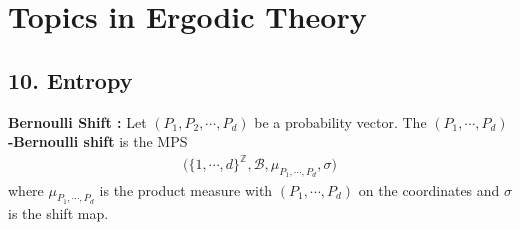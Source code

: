 \documentclass[12pt,a4paper]{report}
\DeclarePairedDelimiter\bignorm{\lVert}{\rVert}
\begin{document}
\newcommand{\thm}{\textbf{Theorem) }}
\newcommand{\thmnum}[1]{\textbf{Theorem #1) }}
\newcommand{\defi}{\textbf{Definition) }}
\newcommand{\lem}{\textbf{Lemma) }}
\newcommand{\lemnum}[1]{\textbf{Lemma #1) }}
\newcommand{\prop}{\textbf{Proposition) }}
\newcommand{\pf}{\textbf{proof) }}
\newcommand{\cor}{\textbf{Corollary) }}
\newcommand{\cornum}[1]{\textbf{Corollary #1) }}

\newcommand{\lap}{\triangle} %
\newcommand{\s}{\vspace{10pt}}
\newcommand{\bull}{$\bullet$}
\newcommand{\sta}{$\star$}
\newcommand{\reals}{\mathbb{R}}

\newcommand{\eop}{\hfill  \textsl{(End of proof)} $\square$} %

\newcommand{\intN}{\mathbb{Z}_N}
\newcommand{\norms}[2]{\bignorm[\big]{#1}_{#2}}
\newcommand{\abs}[1]{\big| #1 \big|}
\newcommand{\avg}{\mathbb{E}}
\newcommand{\borel}{\mathscr{B}}
\newcommand{\setlimsup}[2]{\bigcap_{#1=1}^{\infty}\bigcup_{#2=#1}^{\infty}}
\newcommand{\dlim}{D\text{-}\lim}
\newcommand{\clim}{C\text{-}\lim}

\newcommand{\ndiv}{\hspace{-5pt}\not|\hspace{3pt}}

\newcommand{\newday}{======================================================================}
\newcommand{\digression}{**********************************************************************************************}

\setlength\parindent{0pt}
\noindent

\chapter*{Topics in Ergodic Theory}
\s

\section*{10. Entropy}

\textbf{Bernoulli Shift : } Let $(P_1, P_2,\cdots, P_d)$ be a probability vector. The \textbf{$(P_1, \cdots, P_d)$-Bernoulli shift} is the MPS
\begin{align*}
\big( \{1,\cdots, d\}^{\mathbb{Z}}, \borel, \mu_{P_1,\cdots, P_d},\sigma \big)
\end{align*}
where $\mu_{P_1,\cdots, P_d}$ is the product measure with $(P_1,\cdots, P_d)$ on the coordinates and $\sigma$ is the shift map.
\s
\end{document}
